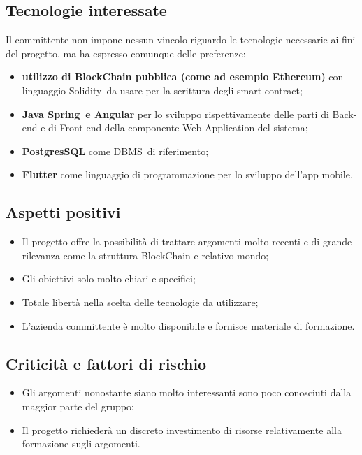 \subsection{Tecnologie interessate}
Il committente non impone nessun vincolo riguardo le tecnologie necessarie ai fini del progetto, ma ha espresso comunque delle preferenze:
\begin{itemize}
	\item \textbf{utilizzo di BlockChain\glo{} pubblica (come ad esempio Ethereum\glo)} con linguaggio Solidity\glo\ da usare per la scrittura degli {smart contract}\glo;
	\item \textbf{Java Spring\glo\ e Angular\glo} per lo sviluppo rispettivamente delle parti di Back-end e di Front-end della componente Web Application del sistema;
	\item \textbf{PostgresSQL\glo} come DBMS\glo\ di riferimento;
	\item \textbf{Flutter\glo} come linguaggio di programmazione per lo sviluppo dell'app mobile.
\end{itemize}

\subsection{Aspetti positivi}
\begin{itemize}
	\item Il progetto offre la possibilità di trattare argomenti molto recenti e di grande rilevanza come la struttura BlockChain\glo{} e relativo mondo;
	\item Gli obiettivi solo molto chiari e specifici;
	\item Totale libertà nella scelta delle tecnologie da utilizzare;
	\item L'azienda committente è molto disponibile e fornisce materiale di formazione.
\end{itemize}

\subsection{Criticità e fattori di rischio}
\begin{itemize}
	\item Gli argomenti nonostante siano molto interessanti sono poco conosciuti dalla maggior parte del gruppo;
	\item Il progetto richiederà un discreto investimento di risorse relativamente alla formazione sugli argomenti.
\end{itemize}

